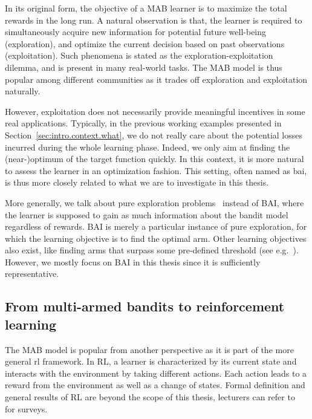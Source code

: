 In its original form, the objective of a MAB learner is to maximize the total rewards in the long run. A natural observation is that, the learner is required to simultaneously acquire new information for potential future well-being (exploration), and optimize the current decision based on past observations (exploitation). Such phenomena is stated as the \gls{exploration-exploitation dilemma}, and is present in many real-world tasks. The MAB model is thus popular among different communities as it trades off exploration and exploitation naturally.

However, exploitation does not necessarily provide meaningful incentives in some real applications. Typically, in the previous working examples presented in Section~\ref{sec:intro.context.what}, we do not really care about the potential losses incurred during the whole learning phase. Indeed, we only aim at finding the (near-)optimum of the target function quickly. In this context, it is more natural to assess the learner in an optimization fashion. This setting, often named as \gls{bai}, is thus more closely related to what we are to investigate in this thesis.

\begin{remark}
\begin{leftbar}[remarkbar]
More generally, we talk about \gls{pure exploration} problems~\citep{bubeck2011pure} instead of BAI, where the learner is supposed to gain as much information about the bandit model regardless of rewards. BAI is merely a particular instance of pure exploration, for which the learning objective is to find the optimal arm. Other learning objectives also exist, like finding arms that surpass some pre-defined threshold (see e.g.~\citealt{locatelli2016thresholding}). However, we mostly focus on BAI in this thesis since it is sufficiently representative.
\end{leftbar}
\end{remark}

\subsection{From multi-armed bandits to reinforcement learning}\label{sec:intro.context.rl}

The MAB model is popular from another perspective as it is part of the more general \gls{rl} framework. In RL, a learner is characterized by its current state and interacts with the environment by taking different actions. Each action leads to a reward from the environment as well as a change of states. Formal definition and general results of RL are beyond the scope of this thesis, lecturers can refer to~\cite{sutton1998,bertsekas2011approximate} for surveys. 

